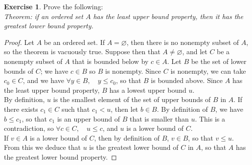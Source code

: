\documentclass[11pt,a4paper,twoside]{article}
\theoremstyle{definition}
\newcounter{excounter}
\newtheorem{exercise}[excounter]{Exercise}
\begin{document}
\begin{exercise}

  Prove the following:\\
  \emph{Theorem: if an ordered set $A$ has the least upper bound property, then it has the greatest lower bound property.}

\end{exercise}

\begin{proof}

  Let $A$ be an ordered set. If $A = \varnothing$, then there is no nonempty subset of $A$, so the theorem is vacuously true.
  Suppose then that $A \neq \varnothing$, and let $C$ be a nonempty subset of $A$ that is bounded below by $c \in A$.
  Let $B$ be the set of lower bounds of $C$; we have $c \in B$ so $B$ is nonempty.
  Since $C$ is nonempty, we can take $c_0 \in C$, and we have $\forall y \in B, \quad y \leq c_0$, so that $B$ is bounded above.
  Since $A$ has the least upper bound property, $B$ has a lowest upper bound $u$.
  \\

  By definition, $u$ is the smallest element of the set of upper bounds of $B$ in $A$. If there exists $c_1 \in C$ such that $c_1 < u$,
  then let $b \in B$. By definition of $B$, we have $b \leq c_1$, so that $c_1$ is an upper bound of $B$ that is smaller than $u$.
  This is a contradiction, so $\forall c \in C, \quad u \leq c$, and $u$ is a lower bound of $C$.
  \\

  If $v \in A$ is a lower bound of $C$, then by definition of $B$, $v \in B$, so that $v \leq u$.
  From this we deduce that $u$ is the greatest lower bound of $C$ in $A$, so that $A$ has the greatest lower bound property.\qedhere

\end{proof}
\end{document}

